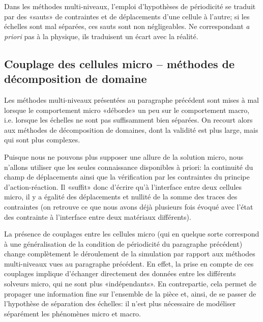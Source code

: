 Dans les méthodes multi-niveaux, l'emploi d'hypothèses de périodicité se traduit par des «sauts» de contraintes et de déplacements d'une cellule à l'autre; si les échelles sont mal séparées, ces sauts sont non négligeables. Ne correspondant \emph{a priori} pas à la physique, ils traduisent un écart avec la réalité.



\medskip
\subsection{Couplage des cellules micro -- méthodes de décomposition de domaine}\label{Sec-dec}

Les méthodes multi-niveaux présentées au paragraphe précédent sont mises à mal lorsque le comportement micro «déborde» un peu sur le comportement macro, i.e. lorsque les échelles ne sont pas suffisamment bien séparées. On recourt alors aux méthodes de décomposition de domaines, dont la validité est plus large, mais qui sont plus complexes.

\medskip
Puisque nous ne pouvons plus supposer une allure de la solution micro, nous n'allons utiliser que les seules connaissance disponibles à priori: la continuité du champ de déplacements ainsi que la vérification par les contraintes du principe d'action-réaction. Il «suffit» donc d'écrire qu'à l'interface entre deux cellules micro, il y a égalité des déplacements et nullité de la somme des traces des contraintes (on retrouve ce que nous avons déjà plusieurs fois évoqué avec l'état des contrainte à l'interface entre deux matériaux différents).

\medskip
La présence de couplages entre les cellules micro (qui en quelque sorte correspond à une généralisation de la condition de périodicité du paragraphe précédent) change complètement le déroulement de la simulation par rapport aux méthodes multi-niveaux vues au paragraphe précédent. En effet, la prise en compte de ces couplages implique d'échanger directement des données entre les différents solveurs micro, qui ne sont plus «indépendants». En contrepartie, cela permet de propager une information fine sur l'ensemble de la pièce et, ainsi, de se passer de l'hypothèse de séparation des échelles: il n'est plus nécessaire de modéliser séparément les phénomènes micro et macro.

